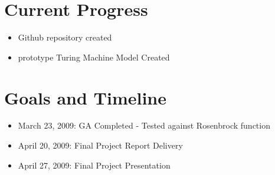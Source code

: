 \section{Current Progress} 
\begin{itemize}
	\item Github repository created
	\item prototype Turing Machine Model Created
\end{itemize}

\section{Goals and Timeline}
\begin{itemize}
	\item March 23, 2009: GA Completed - Tested against Rosenbrock function
	\item April 20, 2009: Final Project Report Delivery
	\item April 27, 2009: Final Project Presentation
\end{itemize}